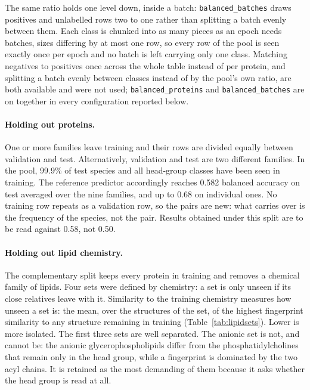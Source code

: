 The same ratio holds one level down, inside a batch: \texttt{balanced\_batches} draws positives
and unlabelled rows two to one rather than splitting a batch evenly between them. Each class is
chunked into as many pieces as an epoch needs batches, sizes differing by at most one row, so
every row of the pool is seen exactly once per epoch and no batch is left carrying only one
class. Matching negatives to positives once across the whole table instead of per protein, and
splitting a batch evenly between classes instead of by the pool's own ratio, are both available
and were not used; \texttt{balanced\_proteins} and \texttt{balanced\_batches} are on together in
every configuration reported below.

\paragraph{Holding out proteins.} One or more families leave training and their rows are divided
equally between validation and test. Alternatively, validation and test are two different
families. In the pool, 99.9\% of test species and all head-group classes have been seen in
training. The reference predictor accordingly reaches 0.582 balanced accuracy on test averaged
over the nine families, and up to 0.68 on individual ones. No training row repeats as a validation
row, so the pairs are new: what carries over is the frequency of the species, not the pair.
Results obtained under this split are to be read against 0.58, not 0.50.

\paragraph{Holding out lipid chemistry.} The complementary split keeps every protein in training
and removes a chemical family of lipids. Four sets were defined by chemistry: a set is only unseen
if its close relatives leave with it. Similarity to the training chemistry measures how unseen a
set is: the mean, over the structures of the set, of the highest fingerprint similarity to any
structure remaining in training (Table~\ref{tab:lipidsets}). Lower is more isolated. The first
three sets are well separated. The anionic set is not, and cannot be: the anionic
glycerophospholipids differ from the phosphatidylcholines that remain only in the head group,
while a fingerprint is dominated by the two acyl chains. It is retained as the most demanding of
them because it asks whether the head group is read at all.

